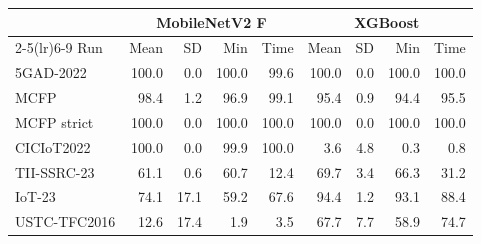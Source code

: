 \begin{tabular}{lrrrrrrrr}
\toprule
& \multicolumn{4}{c}{MobileNetV2 F} & \multicolumn{4}{c}{XGBoost} \\ \cmidrule(lr){2-5}\cmidrule(lr){6-9}
Run & Mean & SD & Min & Time & Mean & SD & Min & Time \\
\midrule
5GAD-2022 & 100.0 & 0.0 & 100.0 & 99.6 & 100.0 & 0.0 & 100.0 & 100.0 \\
MCFP & 98.4 & 1.2 & 96.9 & 99.1 & 95.4 & 0.9 & 94.4 & 95.5 \\
MCFP strict & 100.0 & 0.0 & 100.0 & 100.0 & 100.0 & 0.0 & 100.0 & 100.0 \\
CICIoT2022 & 100.0 & 0.0 & 99.9 & 100.0 & 3.6 & 4.8 & 0.3 & 0.8 \\
TII-SSRC-23 & 61.1 & 0.6 & 60.7 & 12.4 & 69.7 & 3.4 & 66.3 & 31.2 \\
IoT-23 & 74.1 & 17.1 & 59.2 & 67.6 & 94.4 & 1.2 & 93.1 & 88.4 \\
USTC-TFC2016 & 12.6 & 17.4 & 1.9 & 3.5 & 67.7 & 7.7 & 58.9 & 74.7 \\
\bottomrule
\end{tabular}
